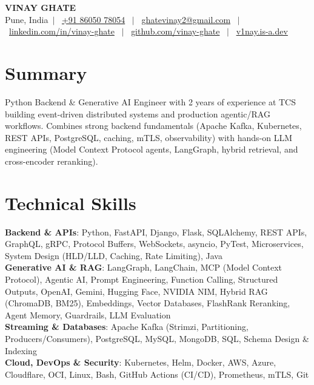 \documentclass[a4paper,10.5pt]{article}
\makeatletter
\newcommand{\fullName}{Vinay Ghate}
\newcommand{\cityCountry}{Pune, India}
\newcommand{\phoneNumber}{+91 86050 78054}
\newcommand{\emailAddr}{ghatevinay2@gmail.com}
\newcommand{\linkedinUrl}{https://www.linkedin.com/in/vinay-ghate}
\newcommand{\githubUrl}{https://github.com/vinay-ghate}
\newcommand{\portfolioUrl}{https://v1nay.is-a.dev}
\makeatother
\begin{document}
\begin{center}
  {\fontsize{24}{28}\selectfont\bfseries \MakeUppercase{\fullName}} \\[4pt]
  \small
  \cityCountry \ $|$ \
  \href{tel:+918605078054}{\phoneNumber} \ $|$ \
  \href{mailto:\emailAddr}{\emailAddr} \ $|$ \
  \href{\linkedinUrl}{linkedin.com/in/vinay-ghate} \ $|$ \
  \href{\githubUrl}{github.com/vinay-ghate} \ $|$ \
  \href{\portfolioUrl}{v1nay.is-a.dev}
\end{center}
\vspace{-8pt}

\section{Summary}
\small{
  Python Backend \& Generative AI Engineer with 2 years of experience at TCS building event-driven distributed systems and production agentic/RAG workflows. Combines strong backend fundamentals (Apache Kafka, Kubernetes, REST APIs, PostgreSQL, caching, mTLS, observability) with hands-on LLM engineering (Model Context Protocol agents, LangGraph, hybrid retrieval, and cross-encoder reranking).
}

\section{Technical Skills}
\begin{itemize}[leftmargin=0.12in, label={}]
  \small{\item{
    \textbf{Backend \& APIs}{: Python, FastAPI, Django, Flask, SQLAlchemy, REST APIs, GraphQL, gRPC, Protocol Buffers, WebSockets, asyncio, PyTest, Microservices, System Design (HLD/LLD, Caching, Rate Limiting), Java} \\
    \textbf{Generative AI \& RAG}{: LangGraph, LangChain, MCP (Model Context Protocol), Agentic AI, Prompt Engineering, Function Calling, Structured Outputs, OpenAI, Gemini, Hugging Face, NVIDIA NIM, Hybrid RAG (ChromaDB, BM25), Embeddings, Vector Databases, FlashRank Reranking, Agent Memory, Guardrails, LLM Evaluation} \\
    \textbf{Streaming \& Databases}{: Apache Kafka (Strimzi, Partitioning, Producers/Consumers), PostgreSQL, MySQL, MongoDB, SQL, Schema Design \& Indexing} \\
    \textbf{Cloud, DevOps \& Security}{: Kubernetes, Helm, Docker, AWS, Azure, Cloudflare, OCI, Linux, Bash, GitHub Actions (CI/CD), Prometheus, mTLS, Git}
  }}
\end{itemize}
\end{document}
